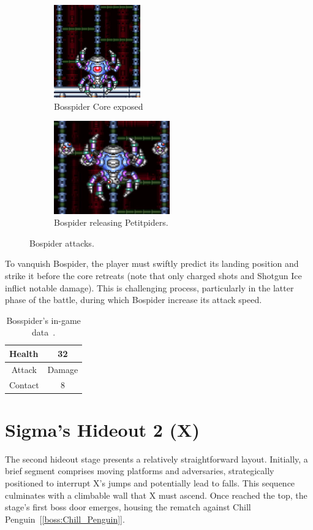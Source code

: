 \begin{figure}[htp]
	\centering
	\begin{subfigure}[t]{0.40\linewidth}
		\centering
		\includegraphics[height=4cm]{figures/X1/Sigma_stages/Bospider_core.jpg}
		\caption{Bosspider Core exposed}
	\end{subfigure}
	\begin{subfigure}[t]{0.45\linewidth}
		\centering
		\includegraphics[height=4cm]{figures/X1/Sigma_stages/Bospider_summon.jpg}
		\caption{Bospider releasing Petitpiders.}
	\end{subfigure}
	\caption{Bospider attacks.}
\end{figure} 

To vanquish Bospider, the player must swiftly predict its landing position and strike it before the core retreats (note that only charged shots and Shotgun Ice inflict notable damage). This is challenging process, particularly in the latter phase of the battle, during which Bospider increase its attack speed. 

\begin{table}[htp]
	\centering
	\begin{tabular}[h]{l c}
		\toprule
		Health  & 32\\
		\midrule
		\multicolumn{1}{c}{Attack} & \multicolumn{1}{c}{Damage}\\
		Contact & 8\\
		\bottomrule
	\end{tabular}
	\caption{Bosspider's in-game data~\cite{wiki:Bospider}. }
\end{table}


\section{Sigma's Hideout 2 (X)}
The second hideout stage presents a relatively straightforward layout. Initially, a brief segment comprises moving platforms and adversaries, strategically positioned to interrupt X's jumps and potentially lead to falls. This sequence culminates with a climbable wall that X must ascend. Once reached the top, the stage's first boss door emerges, housing the rematch against Chill Penguin~[\ref{boss:Chill_Penguin}].

